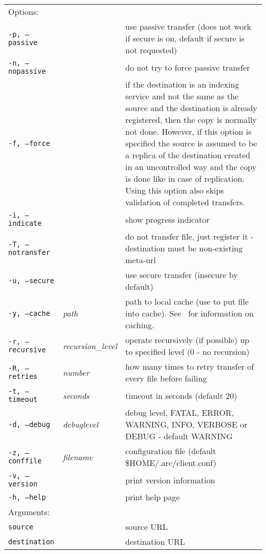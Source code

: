 \begin{longtable}{llp{8cm}}
    Options:&&\\
   \texttt{-p, --passive} && use passive transfer (does not work if secure is on, default if secure is not requested)\\
   \texttt{-n, --nopassive} && do not try to force passive transfer\\
   \texttt{-f, --force} && if the destination is an indexing service and not the same as the source and the destination is already registered, then the copy is normally not done. However, if this option is specified the source is assumed to be a replica of the destination created in an uncontrolled way and the copy is done like in case of replication. Using this option also skips validation of completed transfers.\\
   \texttt{-i, --indicate} && show progress indicator\\
   \texttt{-T, --notransfer} && do not transfer file, just register it - destination must be non-existing meta-url\\
   \texttt{-u, --secure} && use secure transfer (insecure by default)\\
   \texttt{-y, --cache} &\textit{path} & path to local cache (use to put file into cache). See~\cite{a-rex} for information on caching.\\
   \texttt{-r, --recursive} & \textit{recursion\_level} & operate recursively (if possible) up to specified level (0 - no recursion)\\
   \texttt{-R, --retries} & \textit{number} & how many times to retry transfer of every file before failing\\
   \texttt{-t, --timeout}&\textit{seconds}&timeout in seconds (default 20)\\
   \texttt{-d, --debug}&\textit{debuglevel}&debug level, FATAL, ERROR, WARNING, INFO, VERBOSE or DEBUG - default WARNING\\
   \texttt{-z, --conffile}&\textit{filename}& configuration file (default {\$}HOME/.arc/client.conf)\\
   \texttt{-v, --version}&&print version information\\
   \texttt{-h, --help}&&print help page\\
    Arguments:&&\\
    \texttt{source} && source URL\\
    \texttt{destination} && destination URL\\
\end{longtable}

